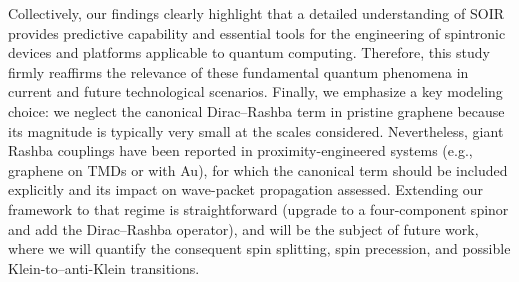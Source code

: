 \documentclass{../assets/templates/iopjournal}
\begin{document}
    Collectively, our findings clearly highlight that a detailed understanding of SOIR provides predictive capability and essential tools for the engineering of spintronic devices and platforms applicable to quantum computing.
    Therefore, this study firmly reaffirms the relevance of these fundamental quantum phenomena in current and future technological scenarios.
    Finally, we emphasize a key modeling choice: we neglect the canonical Dirac–Rashba term in pristine graphene because its magnitude is typically very small at the scales considered.
    Nevertheless, giant Rashba couplings have been reported in proximity-engineered systems (e.g., graphene on TMDs or with Au), for which the canonical term should be included explicitly and its impact on wave-packet propagation assessed.
    Extending our framework to that regime is straightforward (upgrade to a four-component spinor and add the Dirac–Rashba operator), and will be the subject of future work, where we will quantify the consequent spin splitting, spin precession, and possible Klein-to–anti-Klein transitions\cite{AvsarNatCommun2014, WangPhysRevX2016, DellAnnaJPhysCondMatt2018}.





\end{document}
